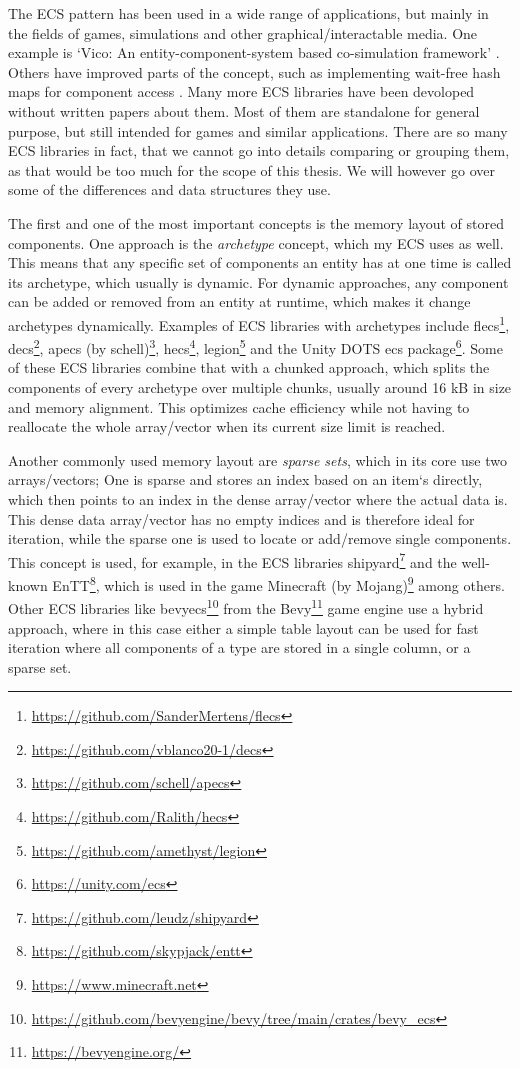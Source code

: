 The ECS pattern has been used in a wide range of applications, but mainly in the fields of games, simulations and other graphical/interactable media. One example is `Vico: An entity-component-system based co-simulation framework' \cite{hatledal2021vico}. Others have improved parts of the concept, such as implementing wait-free hash maps for component access \cite{lange2016wait}. Many more ECS libraries have been devoloped without written papers about them. Most of them are standalone for general purpose, but still intended for games and similar applications. There are so many ECS libraries in fact, that we cannot go into details comparing or grouping them, as that would be too much for the scope of this thesis. We will however go over some of the differences and data structures they use.

The first and one of the most important concepts is the memory layout of stored components. One approach is the \textit{archetype} concept, which my ECS uses as well. This means that any specific set of components an entity has at one time is called its archetype, which usually is dynamic. For dynamic approaches, any component can be added or removed from an entity at runtime, which makes it change archetypes dynamically. Examples of ECS libraries with archetypes include \textsf{flecs}\footnote{\url{https://github.com/SanderMertens/flecs}}, \textsf{decs}\footnote{\url{https://github.com/vblanco20-1/decs}}, \textsf{apecs} (by schell)\footnote{\url{https://github.com/schell/apecs}}, \textsf{hecs}\footnote{\url{https://github.com/Ralith/hecs}}, \textsf{legion}\footnote{\url{https://github.com/amethyst/legion}} and the Unity DOTS ecs package\footnote{\url{https://unity.com/ecs}}. Some of these ECS libraries combine that with a chunked approach, which splits the components of every archetype over multiple chunks, usually around 16 kB in size and memory alignment. This optimizes cache efficiency while not having to reallocate the whole array/vector when its current size limit is reached.

Another commonly used memory layout are \textit{sparse sets}, which in its core use two arrays/vectors; One is sparse and stores an index based on an item`s directly, which then points to an index in the dense array/vector where the actual data is. This dense data array/vector has no empty indices and is therefore ideal for iteration, while the sparse one is used to locate or add/remove single components. This concept is used, for example, in the ECS libraries \textsf{shipyard}\footnote{\url{https://github.com/leudz/shipyard}} and the well-known \textsf{EnTT}\footnote{\url{https://github.com/skypjack/entt}}, which is used in the game \textsf{Minecraft} (by Mojang)\footnote{\url{https://www.minecraft.net}} among others. Other ECS libraries like \textsf{bevy\textunderscore ecs}\footnote{\url{https://github.com/bevyengine/bevy/tree/main/crates/bevy_ecs}} from the \textsf{Bevy}\footnote{\url{https://bevyengine.org/}} game engine use a hybrid approach, where in this case either a simple table layout can be used for fast iteration where all components of a type are stored in a single column, or a sparse set.

